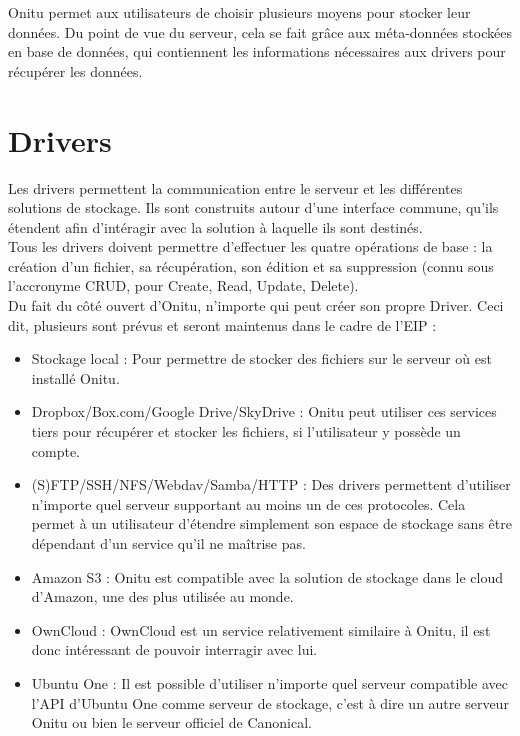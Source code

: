 Onitu permet aux utilisateurs de choisir plusieurs moyens pour stocker leur données. Du point de vue du serveur, cela se fait grâce aux méta-données stockées en base de données, qui contiennent les informations nécessaires aux drivers pour récupérer les données.\\

\section{Drivers}
Les drivers permettent la communication entre le serveur et les différentes solutions de stockage. Ils sont construits autour d'une interface commune, qu'ils étendent afin d'intéragir avec la solution à laquelle ils sont destinés.\\

Tous les drivers doivent permettre d'effectuer les quatre opérations de base : la création d'un fichier, sa récupération, son édition et sa suppression (connu sous l'accronyme CRUD, pour Create, Read, Update, Delete).\\

Du fait du côté ouvert d'Onitu, n'importe qui peut créer son propre Driver. Ceci dit, plusieurs sont prévus et seront maintenus dans le cadre de l'EIP :
\begin{itemize}
    \item Stockage local : Pour permettre de stocker des fichiers sur le serveur où est installé Onitu.
    \item Dropbox/Box.com/Google Drive/SkyDrive : Onitu peut utiliser ces services tiers pour récupérer et stocker les fichiers, si l'utilisateur y possède un compte.
    \item (S)FTP/SSH/NFS/Webdav/Samba/HTTP : Des drivers permettent d'utiliser n'importe quel serveur supportant au moins un de ces protocoles. Cela permet à un utilisateur d'étendre simplement son espace de stockage sans être dépendant d'un service qu'il ne maîtrise pas.
    \item Amazon S3 : Onitu est compatible avec la solution de stockage dans le cloud d'Amazon, une des plus utilisée au monde.
    \item OwnCloud : OwnCloud est un service relativement similaire à Onitu, il est donc intéressant de pouvoir interragir avec lui.
    \item Ubuntu One : Il est possible d'utiliser n'importe quel serveur compatible avec l'API d'Ubuntu One comme serveur de stockage, c'est à dire un autre serveur Onitu ou bien le serveur officiel de Canonical.
\end{itemize}

